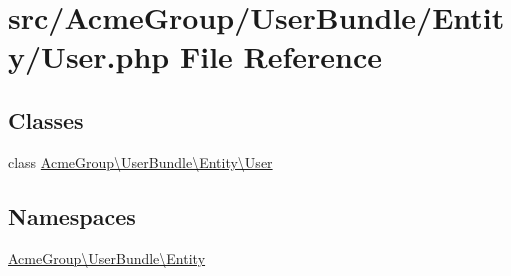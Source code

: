 \hypertarget{_user_8php}{\section{src/\+Acme\+Group/\+User\+Bundle/\+Entity/\+User.php File Reference}
\label{_user_8php}
}
\subsection*{Classes}
\begin{DoxyCompactItemize}
\item 
class \hyperlink{class_acme_group_1_1_user_bundle_1_1_entity_1_1_user}{Acme\+Group\textbackslash{}\+User\+Bundle\textbackslash{}\+Entity\textbackslash{}\+User}
\end{DoxyCompactItemize}
\subsection*{Namespaces}
\begin{DoxyCompactItemize}
\item 
 \hyperlink{namespace_acme_group_1_1_user_bundle_1_1_entity}{Acme\+Group\textbackslash{}\+User\+Bundle\textbackslash{}\+Entity}
\end{DoxyCompactItemize}
